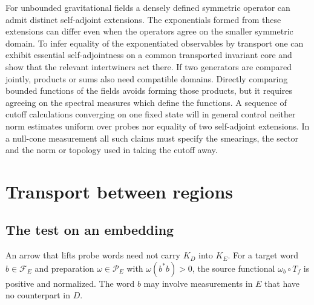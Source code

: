 \documentclass[11pt,letterpaper]{article}
\newcommand{\F}{\mathcal F}
\newcommand{\Probes}{\mathcal P}
\begin{document}
For unbounded gravitational fields a densely defined symmetric operator can admit distinct self-adjoint extensions. The exponentials formed from these extensions can differ even when the operators agree on the smaller symmetric domain. To infer equality of the exponentiated observables by transport one can exhibit essential self-adjointness on a common transported invariant core and show that the relevant intertwiners act there. If two generators are compared jointly, products or sums also need compatible domains. Directly comparing bounded functions of the fields avoids forming those products, but it requires agreeing on the spectral measures which define the functions. A sequence of cutoff calculations converging on one fixed state will in general control neither norm estimates uniform over probes nor equality of two self-adjoint extensions. In a null-cone measurement all such claims must specify the smearings, the sector and the norm or topology used in taking the cutoff away.

\section{Transport between regions}
\label{sec:transport}

\subsection{The test on an embedding}

An arrow that lifts probe words need not carry $K_D$ into $K_E$. For a target word $b\in\F_E$ and preparation $\omega\in\Probes_E$ with $\omega(b^*b)>0$, the source functional $\omega_b\circ T_f$ is positive and normalized. The word $b$ may involve measurements in $E$ that have no counterpart in $D$.
\end{document}
